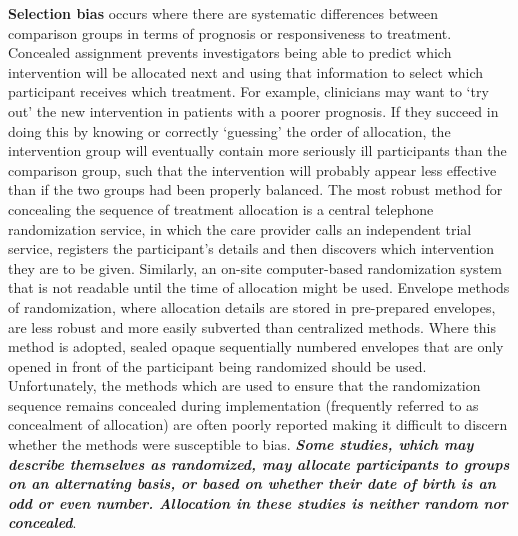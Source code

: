 \documentclass[
  11pt,
  a4paper,
  DIV=11,
  numbers=noendperiod]{scrreprt}
\begin{document}
\textbf{Selection bias} occurs where there are systematic differences
between comparison groups in terms of prognosis or responsiveness to
treatment. Concealed assignment prevents investigators being able to
predict which intervention will be allocated next and using that
information to select which participant receives which treatment. For
example, clinicians may want to `try out' the new intervention in
patients with a poorer prognosis. If they succeed in doing this by
knowing or correctly `guessing' the order of allocation, the
intervention group will eventually contain more seriously ill
participants than the comparison group, such that the intervention will
probably appear less effective than if the two groups had been properly
balanced. The most robust method for concealing the sequence of
treatment allocation is a central telephone randomization service, in
which the care provider calls an independent trial service, registers
the participant's details and then discovers which intervention they are
to be given. Similarly, an on-site computer-based randomization system
that is not readable until the time of allocation might be used.
Envelope methods of randomization, where allocation details are stored
in pre-prepared envelopes, are less robust and more easily subverted
than centralized methods. Where this method is adopted, sealed opaque
sequentially numbered envelopes that are only opened in front of the
participant being randomized should be used. Unfortunately, the methods
which are used to ensure that the randomization sequence remains
concealed during implementation (frequently referred to as concealment
of allocation) are often poorly reported making it difficult to discern
whether the methods were susceptible to bias. \textbf{\emph{Some
studies, which may describe themselves as randomized, may allocate
participants to groups on an alternating basis, or based on whether
their date of birth is an odd or even number. Allocation in these
studies is neither random nor concealed}}.
\end{document}
